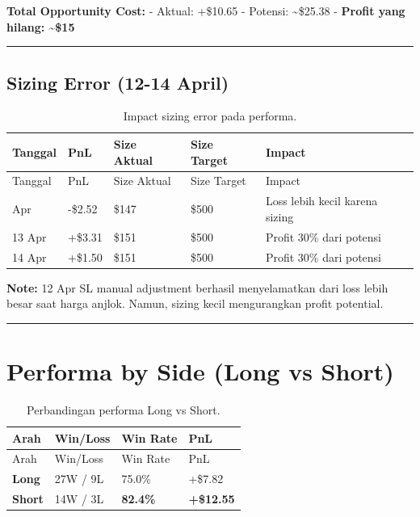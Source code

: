 \documentclass[
  11pt,
  a4paper,
]{article}
\begin{document}
\textbf{Total Opportunity Cost:} - Aktual: +\$10.65 - Potensi:
\textasciitilde\$25.38 - \textbf{Profit yang hilang:
\textasciitilde\$15}

\begin{center}\rule{0.5\linewidth}{0.5pt}\end{center}

\newpage

\subsection{Sizing Error (12-14 April)}\label{sizing-error-12-14-april}

\begin{longtable}[]{@{}lllll@{}}
\caption{Impact sizing error pada
performa.}\label{tbl-sizing}\tabularnewline
\toprule\noalign{}
Tanggal & PnL & Size Aktual & Size Target & Impact \\
\midrule\noalign{}
\endfirsthead
\toprule\noalign{}
Tanggal & PnL & Size Aktual & Size Target & Impact \\
\midrule\noalign{}
\endhead
\bottomrule\noalign{}
\endlastfoot
12 Apr & -\$2.52 & \$147 & \$500 & Loss lebih kecil karena sizing \\
13 Apr & +\$3.31 & \$151 & \$500 & Profit 30\% dari potensi \\
14 Apr & +\$1.50 & \$151 & \$500 & Profit 30\% dari potensi \\
\end{longtable}

\textbf{Note:} 12 Apr SL manual adjustment berhasil menyelamatkan dari
loss lebih besar saat harga anjlok. Namun, sizing kecil mengurangkan
profit potential.

\begin{center}\rule{0.5\linewidth}{0.5pt}\end{center}

\section{Performa by Side (Long vs
Short)}\label{performa-by-side-long-vs-short}

\begin{longtable}[]{@{}llll@{}}
\caption{Perbandingan performa Long vs
Short.}\label{tbl-byside}\tabularnewline
\toprule\noalign{}
Arah & Win/Loss & Win Rate & PnL \\
\midrule\noalign{}
\endfirsthead
\toprule\noalign{}
Arah & Win/Loss & Win Rate & PnL \\
\midrule\noalign{}
\endhead
\bottomrule\noalign{}
\endlastfoot
\textbf{Long} & 27W / 9L & 75.0\% & +\$7.82 \\
\textbf{Short} & 14W / 3L & \textbf{82.4\%} & \textbf{+\$12.55} \\
\end{longtable}
\end{document}
